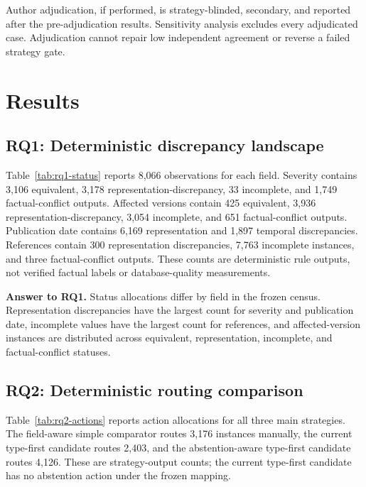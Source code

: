 \documentclass[preprint,review,12pt,authoryear]{elsarticle}
\begin{document}
Author adjudication, if performed, is strategy-blinded, secondary, and reported
after the pre-adjudication results. Sensitivity analysis excludes every
adjudicated case. Adjudication cannot repair low independent agreement or
reverse a failed strategy gate.

\section{Results}
\label{sec:results}

\subsection{RQ1: Deterministic discrepancy landscape}



Table~\ref{tab:rq1-status} reports 8,066 observations for each field. Severity
contains 3,106 equivalent, 3,178 representation-discrepancy, 33 incomplete, and
1,749 factual-conflict outputs. Affected versions contain 425 equivalent, 3,936
representation-discrepancy, 3,054 incomplete, and 651 factual-conflict outputs.
Publication date contains 6,169 representation and 1,897 temporal discrepancies.
References contain 300 representation discrepancies, 7,763 incomplete
instances, and three factual-conflict outputs. These counts are deterministic
rule outputs, not verified factual labels or database-quality measurements.

\textbf{Answer to RQ1.} Status allocations differ by field in the frozen census.
Representation discrepancies have the largest count for severity and publication
date, incomplete values have the largest count for references, and
affected-version instances are distributed across equivalent, representation,
incomplete, and factual-conflict statuses.

\subsection{RQ2: Deterministic routing comparison}




Table~\ref{tab:rq2-actions} reports action allocations for all three main
strategies. The field-aware simple comparator routes 3,176 instances manually,
the current type-first candidate routes 2,403, and the abstention-aware
type-first candidate routes 4,126. These are strategy-output counts; the current
type-first candidate has no abstention action under the frozen mapping.
\end{document}
